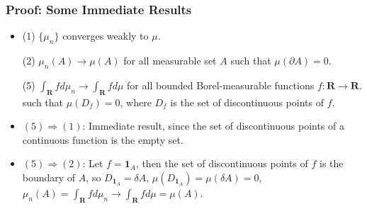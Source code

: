 \documentclass[handout]{beamer}
\newcommand{\BI}{\mathbf{1}}
\begin{document}
\frame
{
  \frametitle{Proof: Some Immediate Results} 

   \begin{itemize}

               \item<1->   (1) $\{\mu_n\}$ converges weakly to $\mu$. 
               \vspace{2mm}
               
                 {\color{blue} (2) $\mu_n(A)\rightarrow \mu(A)$ for all measurable set $A$ such that $\mu(\partial A)=0$. }
                              \vspace{2mm}


               (5) $\int_{\mathbf{R}}f d\mu_n \rightarrow \int_{\mathbf{R}}f d\mu$ for all bounded Borel-measurable functions $f:\mathbf{R}\rightarrow \mathbf{R}$. such that $\mu(D_f)=0$, where $D_f$ is the set of discontinuous points of $f$. 
                                            \vspace{5mm}


                     \item<2-> $(5)\Rightarrow (1)$: Immediate result, since the set of discontinuous points of a continuous function is the empty set. 
                     
                      \item<3-> $(5)\Rightarrow (2)$: Let $f=\BI_{A}$, then the set of discontinuous points of $f$ is the boundary of $A$, so  $D_{\BI_A}=\delta A$, $\mu(D_{\BI_A})=\mu(\delta A)=0$,  $\mu_n(A)=\int_{\mathbf{R}}f d\mu_n  \rightarrow \int_{\mathbf{R}}f d\mu =\mu(A)$.
                     
                                       
                     
                     
                                               \end{itemize}
}
\end{document}
